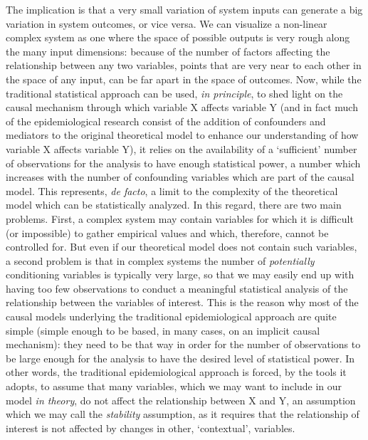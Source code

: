 \documentclass[review]{elsarticle}
\begin{document}
The implication is that a very small variation of system inputs can generate a big variation in system outcomes, or vice versa. 
We can visualize a non-linear complex system as one where the space of possible outputs is very rough along the many input dimensions: because of the number of factors affecting the relationship between any two variables, points that are very near to each other in the space of any input, can be far apart in the space of outcomes. Now, while the traditional statistical approach can be used, \textit{in principle}, to shed light on the causal mechanism through which variable X affects variable Y (and in fact much of the epidemiological research consist of the addition of confounders and mediators to the original theoretical model to enhance our understanding of how variable X affects variable Y), it relies on the availability of a `sufficient' number of observations for the analysis to have enough statistical power, a number which increases with the number of confounding variables which are part of the causal model.
This represents, \textit{de facto}, a limit to the complexity of the theoretical model which can be statistically analyzed. In this regard, there are two main problems. First, a complex system may contain variables for which it is difficult (or impossible) to gather empirical values and which, therefore, cannot be controlled for. But even if our theoretical model does not contain such variables, a second problem is that in complex systems the number of \textit{potentially} conditioning variables is typically very large, so that we may easily end up with having too few observations to conduct a meaningful statistical analysis of the relationship between the variables of interest.
This is the reason why most of the causal models underlying the traditional epidemiological approach are quite simple (simple enough to be based, in many cases, on an implicit causal mechanism): they need to be that way in order for the number of observations to be large enough for the analysis to have the desired level of statistical power. In other words, the traditional epidemiological approach is forced, by the tools it adopts, to assume that many variables, which we may want to include in our model \textit{in theory}, do not affect the relationship between X and Y, an assumption which we may call the \textit{stability} assumption, as it requires that the relationship of interest is not affected by changes in other, `contextual', variables.
\end{document}
